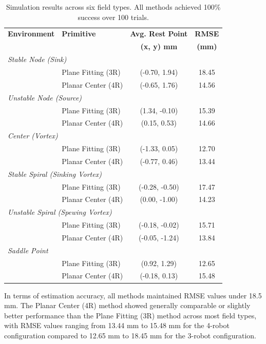 \documentclass[lettersize,journal]{IEEEtran}
\begin{document}
\begin{table}[h]
\centering
\begin{tabular}{llcc}
\hline
\textbf{Environment} & \textbf{Primitive} & \textbf{Avg. Rest Point} & \textbf{RMSE} \\
 & & \textbf{(x, y) mm} & \textbf{(mm)} \\
\hline
\multicolumn{4}{l}{\textit{Stable Node (Sink)}} \\
\hline
 & Plane Fitting (3R) & (-0.70, 1.94) & 18.45 \\
 & Planar Center (4R) & (-0.65, 1.76) & 14.56 \\
\hline
\multicolumn{4}{l}{\textit{Unstable Node (Source)}} \\
\hline
 & Plane Fitting (3R) & (1.34, -0.10) & 15.39 \\
 & Planar Center (4R) & (0.15, 0.53) & 14.66 \\
\hline
\multicolumn{4}{l}{\textit{Center (Vortex)}} \\
\hline
 & Plane Fitting (3R) & (-1.33, 0.05) & 12.70 \\
 & Planar Center (4R) & (-0.77, 0.46) & 13.44 \\
\hline
\multicolumn{4}{l}{\textit{Stable Spiral (Sinking Vortex)}} \\
\hline
 & Plane Fitting (3R) & (-0.28, -0.50) & 17.47 \\
 & Planar Center (4R) & (0.00, -1.00) & 14.23 \\
\hline
\multicolumn{4}{l}{\textit{Unstable Spiral (Spewing Vortex)}} \\
\hline
 & Plane Fitting (3R) & (-0.18, -0.02) & 15.71 \\
 & Planar Center (4R) & (-0.05, -1.24) & 13.84 \\
\hline
\multicolumn{4}{l}{\textit{Saddle Point}} \\
\hline
 & Plane Fitting (3R) & (0.92, 1.29) & 12.65 \\
 & Planar Center (4R) & (-0.18, 0.13) & 15.48 \\
\hline
\end{tabular}
\caption{Simulation results across six field types. All methods achieved 100\% success over 100 trials.}
\label{tab:simulation_estimation_results}
\end{table}


In terms of estimation accuracy, all methods maintained RMSE values under 18.5 mm. The Planar Center (4R) method showed generally comparable or slightly better performance than the Plane Fitting (3R) method across most field types, with RMSE values ranging from 13.44 mm to 15.48 mm for the 4-robot configuration compared to 12.65 mm to 18.45 mm for the 3-robot configuration.
\end{document}
